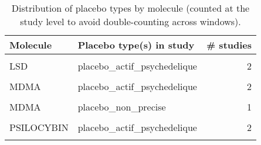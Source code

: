 \begin{table}[!h]
\centering
\caption{\label{tab:tab:placebo_distribution_by_study}Distribution of placebo types by molecule (counted at the study level to avoid double-counting across windows).}
\centering
\begin{tabular}[t]{llr}
\toprule
Molecule & Placebo type(s) in study & \# studies\\
\midrule
\cellcolor{gray!10}{AYAHUASCA} & \cellcolor{gray!10}{placebo\_inactif} & \cellcolor{gray!10}{2}\\
LSD & placebo\_actif\_psychedelique & 2\\
\cellcolor{gray!10}{LSD} & \cellcolor{gray!10}{placebo\_inactif} & \cellcolor{gray!10}{2}\\
MDMA & placebo\_actif\_psychedelique & 2\\
\cellcolor{gray!10}{MDMA} & \cellcolor{gray!10}{placebo\_inactif} & \cellcolor{gray!10}{7}\\
\addlinespace
MDMA & placebo\_non\_precise & 1\\
\cellcolor{gray!10}{PSILOCYBIN} & \cellcolor{gray!10}{placebo\_actif\_non\_psychedelique} & \cellcolor{gray!10}{1}\\
PSILOCYBIN & placebo\_actif\_psychedelique & 2\\
\cellcolor{gray!10}{PSILOCYBIN} & \cellcolor{gray!10}{placebo\_inactif} & \cellcolor{gray!10}{6}\\
\bottomrule
\end{tabular}
\end{table}
